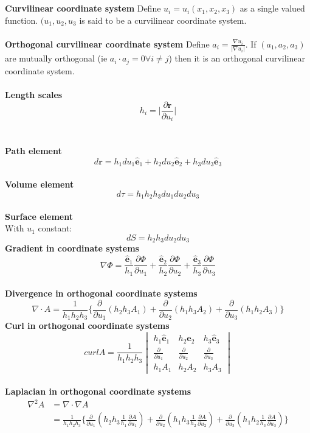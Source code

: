 \documentclass{article}
\begin{document}
\\
\\
\textbf{Curvilinear coordinate system} Define $u_i = u_i(x_1, x_2, x_3)$ as a single valued function. $(u_1, u_2, u_3$ is said to be a curvilinear coordinate system. 
\\
\\
\textbf{Orthogonal curvilinear coordinate system}
Define $a_i = \frac{\nabla u_i}{| \nabla u_i |}$. If $(a_1, a_2, a_3)$ are mutually orthogonal (ie $a_i \cdot a_j = 0 \forall i \ne j$) then it is an orthogonal curvilinear coordinate system.
\\
\\
\textbf{Length scales}
\\
$$
h_i = \bigg | \frac{\partial \mathbf{r}}{\partial u_i} \bigg |
$$
\\
\\
\textbf{Path element} 
$$
d\mathbf{r} = h_1du_1\hat{\mathbf{e}}_1 + h_2du_2\hat{\mathbf{e}}_2 + 
h_3du_3\hat{\mathbf{e}}_3
$$
\\
\textbf{Volume element}
$$
d\tau = h_1h_2h_3du_1du_2du_3
$$
\\
\textbf{Surface element}
\\
With $u_1$ constant:
$$
dS = h_2h_3du_2du_3
$$
\textbf{Gradient in coordinate systems}
$$
\nabla \Phi = \frac{\hat{\mathbf{e}}_1}{h_1} \frac{\partial \Phi}{\partial u_1} +  \frac{\hat{\mathbf{e}}_2}{h_2} \frac{\partial \Phi}{\partial u_2} +  \frac{\hat{\mathbf{e}}_3}{h_3} \frac{\partial \Phi}{\partial u_3}
$$
\\
\textbf{Divergence in orthogonal coordinate systems}
$$
\nabla \cdot A = \frac{1}{h_1h_2h_3} \bigg \{ \frac{\partial}{\partial u_1}(h_2h_3A_1) +\frac{\partial}{\partial u_2}(h_1h_3A_2) + \frac{\partial}{\partial u_3}(h_1h_2A_3) \bigg \}
$$
\textbf{Curl in orthogonal coordinate systems}
$$
curl A = \frac{1}{h_1h_2h_3} \begin{vmatrix} h_1\hat{\mathbf{e}}_1 & h_2\hat{\mathbf{e}}_2 & h_3\hat{\mathbf{e}}_3 \\
\frac{\partial}{\partial u_1} & \frac{\partial}{\partial u_2} & \frac{\partial}{\partial u_3}  \\ h_1A_1 & h_2A_2 & h_3A_3\end{vmatrix}
$$
\\
\textbf{Laplacian in orthogonal coordinate systems}
\begin{align*}
\nabla^2 A &= \nabla \cdot \nabla A \\
&= \frac{1}{h_1h_2h_3} \bigg \{ \frac{\partial}{\partial u_1}(h_2h_3\frac{1}{h_1}\frac{\partial A}{\partial u_1}) +\frac{\partial}{\partial u_2}(h_1h_3\frac{1}{h_2}\frac{\partial A}{\partial u_2}) + \frac{\partial}{\partial u_3}(h_1h_2\frac{1}{h_3}\frac{\partial A}{\partial u_3}) \bigg \}
\end{align*}
\end{document}
